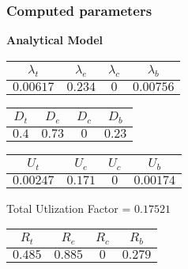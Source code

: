 \documentclass{article}
\begin{document}
\subsubsection{Computed parameters}
\begin{minipage}{0.5\textwidth}
\centering	\textbf{Analytical Model}
\begin{table}[H]
\centering
\begin{tabular}{@{}cccc@{}}
\toprule
$\lambda_t$ & $\lambda_e$ & $\lambda_c$ & $\lambda_b$\\
\midrule
$0.00617$ & $0.234$ & $0$ & $0.00756$\\
\bottomrule
\end{tabular}
\end{table}\begin{table}[H]
\centering
\begin{tabular}{@{}cccc@{}}
\toprule
$D_t$ & $D_e$ & $D_c$ & $D_b$\\
\midrule
$0.4$ & $0.73$ & $0$ & $0.23$\\
\bottomrule
\end{tabular}
\end{table}\begin{table}[H]
\centering
\begin{tabular}{@{}cccc@{}}
\toprule
$U_t$ & $U_e$ & $U_c$ & $U_b$\\
\midrule
$0.00247$ & $0.171$ & $0$ & $0.00174$\\
\bottomrule
\end{tabular}
\end{table}
\centering Total Utlization Factor = $0.17521$
\begin{table}[H]
\centering
\begin{tabular}{@{}cccc@{}}
\toprule
$R_t$ & $R_e$ & $R_c$ & $R_b$\\
\midrule
$0.485$ & $0.885$ & $0$ & $0.279$\\
\bottomrule
\end{tabular}
\end{table}
\end{minipage}
\end{document}

